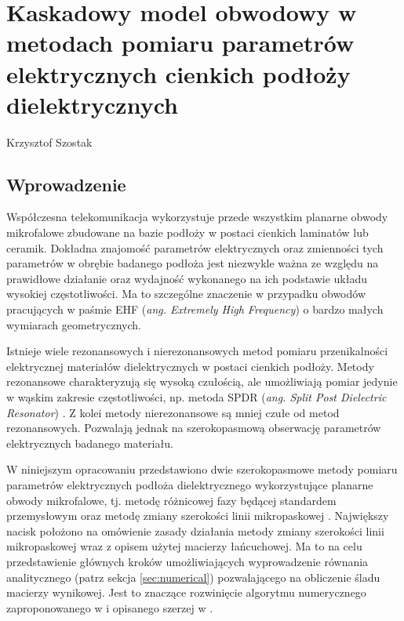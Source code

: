 \chapter[Kaskadowy model \ldots]{Kaskadowy model obwodowy w metodach pomiaru parametrów elektrycznych cienkich podłoży dielektrycznych}
\thispagestyle{empty}
\vspace{-8mm} {\large Krzysztof Szostak} \vspace{8mm}

\section{Wprowadzenie}
Współczesna telekomunikacja wykorzystuje przede wszystkim planarne obwody mikrofalowe zbudowane na bazie podłoży w postaci cienkich laminatów lub ceramik. Dokładna znajomość parametrów elektrycznych oraz zmienności tych parametrów w obrębie badanego podłoża jest niezwykle ważna ze względu na prawidłowe działanie oraz wydajność wykonanego na ich podstawie układu wysokiej częstotliwości. Ma to szczególne znaczenie w przypadku obwodów pracujących w paśmie EHF (\textit{ang. Extremely High Frequency}) o bardzo małych wymiarach geometrycznych.
\par Istnieje wiele rezonansowych \cite{cite:res1,cite:res2} i nierezonansowych \cite{cite:nonres1,cite:nonres2}  metod pomiaru przenikalności elektrycznej materiałów dielektrycznych w postaci cienkich podłoży. Metody rezonansowe charakteryzują się wysoką czułością, ale umożliwiają pomiar jedynie w wąskim zakresie częstotliwości, np. metoda SPDR (\textit{ang. Split Post Dielectric Resonator}) \cite{cite:SPDR}. Z kolei metody nierezonansowe są mniej czułe od metod rezonansowych. Pozwalają jednak na szerokopasmową obserwację parametrów elektrycznych badanego materiału.
\par W niniejszym opracowaniu przedstawiono dwie szerokopasmowe metody pomiaru parametrów elektrycznych podłoża dielektrycznego wykorzystujące planarne obwody mikrofalowe, tj. metodę różnicowej fazy \cite{cite:two_lines_method} będącej standardem przemysłowym oraz metodę zmiany szerokości linii mikropaskowej \cite{cite:line_width_method}. Największy nacisk położono na omówienie zasady działania metody zmiany szerokości linii mikropaskowej wraz z opisem użytej macierzy łańcuchowej. Ma to na celu przedstawienie głównych kroków umożliwiających wyprowadzenie równania analitycznego (patrz sekcja \ref{sec:numerical}) pozwalającego na obliczenie śladu macierzy wynikowej. Jest to znaczące rozwinięcie algorytmu numerycznego zaproponowanego w \cite{cite:line_width_method} i opisanego szerzej w \cite{cite:doktorat}.


